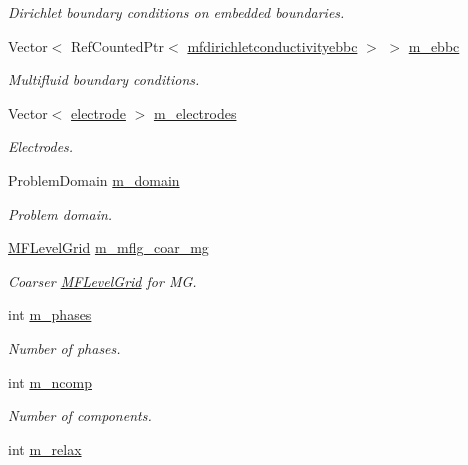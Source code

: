 \begin{DoxyCompactItemize}
\begin{DoxyCompactList}\small\item\em Dirichlet boundary conditions on embedded boundaries. \end{DoxyCompactList}\item 
Vector$<$ Ref\+Counted\+Ptr$<$ \hyperlink{classmfdirichletconductivityebbc}{mfdirichletconductivityebbc} $>$ $>$ \hyperlink{classnwomfconductivityop_aa31a3b685e2e5714a2654c3e8f192275}{m\+\_\+ebbc}
\begin{DoxyCompactList}\small\item\em Multifluid boundary conditions. \end{DoxyCompactList}\item 
Vector$<$ \hyperlink{classelectrode}{electrode} $>$ \hyperlink{classnwomfconductivityop_a8033bcd5f84abedfd4647538f3a1422f}{m\+\_\+electrodes}
\begin{DoxyCompactList}\small\item\em Electrodes. \end{DoxyCompactList}\item 
Problem\+Domain \hyperlink{classnwomfconductivityop_a50ab53648a2fe88ecac4ba4eb701f232}{m\+\_\+domain}
\begin{DoxyCompactList}\small\item\em Problem domain. \end{DoxyCompactList}\item 
\hyperlink{classMFLevelGrid}{M\+F\+Level\+Grid} \hyperlink{classnwomfconductivityop_af7c39316fba3146e24103e340836afa0}{m\+\_\+mflg\+\_\+coar\+\_\+mg}
\begin{DoxyCompactList}\small\item\em Coarser \hyperlink{classMFLevelGrid}{M\+F\+Level\+Grid} for MG. \end{DoxyCompactList}\item 
int \hyperlink{classnwomfconductivityop_a2c1f4411cb7f77c9b2a3f4a9b4792c16}{m\+\_\+phases}
\begin{DoxyCompactList}\small\item\em Number of phases. \end{DoxyCompactList}\item 
int \hyperlink{classnwomfconductivityop_a199f8baac17dbcc13ea649c6bde933b3}{m\+\_\+ncomp}
\begin{DoxyCompactList}\small\item\em Number of components. \end{DoxyCompactList}\item 
int \hyperlink{classnwomfconductivityop_a106ae6d195e5b5cb4a5f3afe5e7786d1}{m\+\_\+relax}

\end{DoxyCompactItemize}
